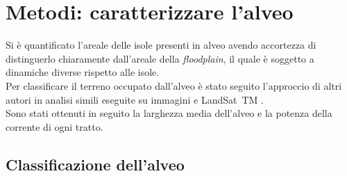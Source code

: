 \section{Metodi: caratterizzare l'alveo}
Si è quantificato l'areale delle isole presenti in alveo avendo accortezza di distinguerlo chiaramente dall'areale della \emph{floodplain}, il quale è soggetto a dinamiche diverse rispetto alle isole.
\\
Per classificare il terreno occupato dall'alveo è stato seguito l'approccio di altri autori in analisi simili eseguite su immagini \AST{} e LandSat~TM .
\\
Sono stati ottenuti in seguito la larghezza media dell'alveo e la potenza della corrente di ogni tratto.

\subsection{Classificazione dell'alveo}
